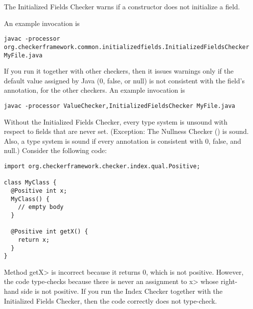 \htmlhr
{}

The Initialized Fields Checker warns if a constructor does not initialize a
field.



An example invocation is

\begin{Verbatim}
javac -processor org.checkerframework.common.initializedfields.InitializedFieldsChecker MyFile.java
\end{Verbatim}

If you run it together with other checkers, then it issues warnings only if
the default value assigned by Java (0, false, or null) is not consistent
with the field's annotation, for the other checkers.
An example invocation is

\begin{Verbatim}
javac -processor ValueChecker,InitializedFieldsChecker MyFile.java
\end{Verbatim}



Without the Initialized Fields Checker, every type system is
unsound with respect to fields that are never set.  (Exception:  The
Nullness Checker () is sound. Also, a type
system is sound if every annotation is consistent with 0, false, and null.)
Consider the following code:

\begin{Verbatim}
import org.checkerframework.checker.index.qual.Positive;

class MyClass {
  @Positive int x;
  MyClass() {
    // empty body
  }

  @Positive int getX() {
    return x;
  }
}
\end{Verbatim}

\noindent
Method \<getX> is incorrect because it returns 0, which is not positive.
However, the code type-checks because there is never an assignment to \<x>
whose right-hand side is not positive.
If you run the Index Checker together with the Initialized Fields Checker,
then the code correctly does not type-check.


